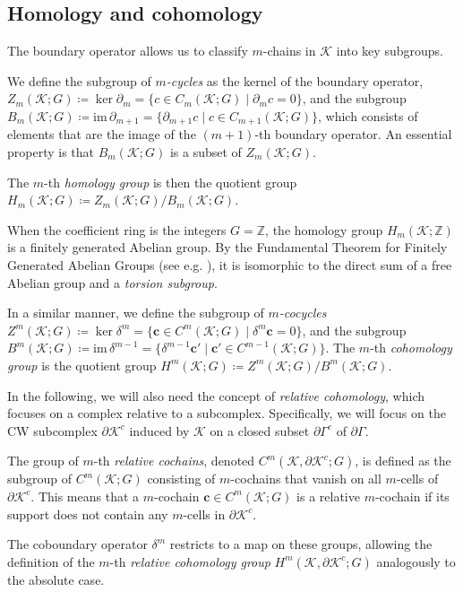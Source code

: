 \documentclass[a4paper,twoside,10pt]{article}
\theoremstyle{plain}
\theoremstyle{definition}
\theoremstyle{remark}
\newcommand{\mc}{\mathcal}
\newcommand{\K}{\mc{K}}
\newcommand{\cochain}[1]{\mathbf #1}
\begin{document}
\subsection{Homology and cohomology}
The boundary operator allows us to classify $m$-chains in $\K$ into key subgroups.

We define the subgroup of \emph{$m$-cycles} as the kernel of the boundary operator, $Z_m(\K;G) \coloneqq \ker \partial_m = \{c \in C_m(\K;G) \mid \partial_m c = 0\}$, and the subgroup $B_m(\K;G) \coloneqq \mathrm{im}\, \partial_{m+1} = \{\partial_{m+1} c \mid c \in C_{m+1}(\K;G) \}$, which consists of elements that are the image of the $(m+1)$-th boundary operator.
An essential property is that $B_m(\K;G)$ is a subset of $Z_m(\K;G)$.

The $m$-th \emph{homology group} is then the quotient group $H_m(\K;G) \coloneqq Z_m(\K;G)/B_m(\K;G)$.

When the coefficient ring is the integers $G = \mathbb{Z}$, the homology group $H_m(\K; \mathbb{Z})$ is a finitely generated Abelian group.
By the Fundamental Theorem for Finitely Generated Abelian Groups (see e.g. \cite[Theorem~3.61]{kaczynski2006computational}), it is isomorphic to the direct sum of a free Abelian group and a \emph{torsion subgroup}.

In a similar manner, we define the subgroup of \emph{$m$-cocycles} $Z^m(\K;G) \coloneqq \ker \delta^m = \{\cochain c \in C^m(\K;G) \mid \delta^m \cochain c = 0\}$, and the subgroup $B^m(\K;G) \coloneqq \mathrm{im}\, \delta^{m-1} = \{\delta^{m-1} \cochain c' \mid \cochain c' \in C^{m-1}(\K;G)\}$.
The $m$-th \emph{cohomology group} is the quotient group $H^m(\K;G) \coloneqq Z^m(\K;G) / B^m(\K;G)$.

In the following, we will also need the concept of \emph{relative cohomology}, which focuses on a complex relative to a subcomplex.
Specifically, we will focus on the CW subcomplex $\partial \K^c$ induced by $\K$ on a closed subset $\partial \Gamma^c$ of $\partial \Gamma$.

The group of $m$-th \emph{relative cochains}, denoted $C^m(\K,\partial \K^c;G)$, is defined as the subgroup of $C^m(\K;G)$ consisting of $m$-cochains that vanish on all $m$-cells of $\partial \K^c$.
This means that a $m$-cochain $\cochain c \in C^m(\K;G)$ is a relative $m$-cochain if its support does not contain any $m$-cells in $\partial \K^c$.

The coboundary operator $\delta^m$ restricts to a map on these groups, allowing the definition of the $m$-th \emph{relative cohomology group} $H^m(\K,\partial \K^c;G)$ analogously to the absolute case.
\end{document}

